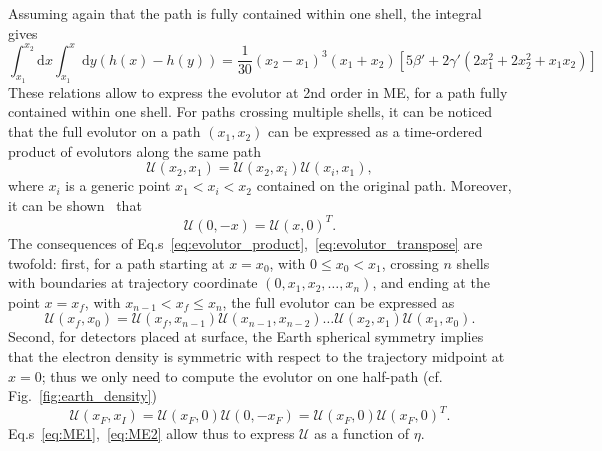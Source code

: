 \documentclass{article}
\newcommand{\de}[0]{\text{d}}
\begin{document}
Assuming again that the path is fully contained within one shell, the integral gives
\begin{equation}\label{eq:ME2}
\int_{x_1}^{x_2} \de x \int_{x_1}^x \de y \left( h(x) - h(y) \right) = \frac{1}{30} \left( x_2 - x_1 \right)^3 \left( x_1 + x_2 \right)\left[ 5 \beta' + 2 \gamma' \left( 2 x_1^2 +  2x_2^2 + x_1 x_2 \right) \right]
\end{equation}
These relations allow to express the evolutor at 2nd order in ME, for a path fully contained within one shell. For paths crossing multiple shells, it can be noticed~\cite{Lisi:1997yc} that the full evolutor on a path $(x_1,x_2)$ can be expressed as a time-ordered product of evolutors along the same path
\begin{equation}\label{eq:evolutor_product}
	\mathcal{U}(x_2, x_1) = \mathcal{U}(x_2, x_i) \mathcal{U}(x_i, x_1),
\end{equation}
where $x_i$ is a generic point $x_1 < x_i <x_2$ contained on the original path. Moreover, it can be shown~\cite{Lisi:1997yc} that
\begin{equation}\label{eq:evolutor_transpose}
	\mathcal{U}(0, -x) = \mathcal{U}(x,0)^T.
\end{equation}
The consequences of Eq.s~\ref{eq:evolutor_product},~\ref{eq:evolutor_transpose} are twofold: first, for a path starting at $x=x_0$, with $0\leq  x_0 < x_1$,  crossing $n$ shells with boundaries at trajectory coordinate $(0, x_1, x_2, \dots, x_n)$, and ending at the point $x=x_f$, with $x_{n-1} < x_f \leq x_n$, the full evolutor can be expressed as
\begin{equation}
	\mathcal{U}(x_f, x_0) = \mathcal{U}(x_f, x_{n-1})\mathcal{U}(x_{n-1},x_{n-2})\dots \mathcal{U}(x_2, x_1)\mathcal{U}(x_1, x_0).
\end{equation}
Second, for detectors placed at surface, the Earth spherical symmetry implies that the electron density is symmetric with respect to the trajectory midpoint at $x=0$; thus we only need to compute the evolutor on one half-path (cf. Fig.~\ref{fig:earth_density})
\begin{equation}
	\mathcal{U}(x_F,x_I) = \mathcal{U}(x_F, 0) \mathcal{U}(0, - x_F) = \mathcal{U}(x_F, 0) \mathcal{U}(x_F, 0)^T.
\end{equation}
Eq.s~\ref{eq:ME1},~\ref{eq:ME2} allow thus to express $\mathcal{U}$ as a function of $\eta$.
\end{document}
